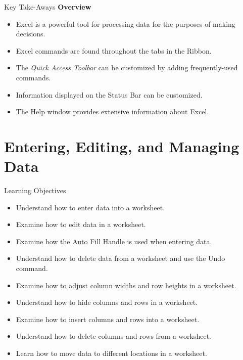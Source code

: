 \begin{center}
	\begin{tkwbox}{Key Take-Aways}
		\textbf{Overview}
		\\
		\begin{itemize}
			\setlength{\itemsep}{0pt}
			\setlength{\parskip}{0pt}
			\setlength{\parsep}{0pt}
			
			\item Excel is a powerful tool for processing data for the purposes of making decisions.
			\item Excel commands are found throughout the tabs in the Ribbon.
			\item The \textit{Quick Access Toolbar} can be customized by adding frequently-used commands.
			\item Information displayed on the Status Bar can be customized.
			\item The Help window provides extensive information about Excel.
			
		\end{itemize}
	\end{tkwbox}
\end{center}

\section{Entering, Editing, and Managing Data}

\begin{center}
	\begin{objbox}{Learning Objectives}
		\begin{itemize}
			\setlength{\itemsep}{0pt}
			\setlength{\parskip}{0pt}
			\setlength{\parsep}{0pt}
			
			\item Understand how to enter data into a worksheet.
			\item Examine how to edit data in a worksheet.
			\item Examine how the Auto Fill Handle is used when entering data.
			\item Understand how to delete data from a worksheet and use the Undo command.
			\item Examine how to adjust column widths and row heights in a worksheet.
			\item Understand how to hide columns and rows in a worksheet.
			\item Examine how to insert columns and rows into a worksheet.
			\item Understand how to delete columns and rows from a worksheet.
			\item Learn how to move data to different locations in a worksheet.

		\end{itemize}
	\end{objbox}
\end{center}

